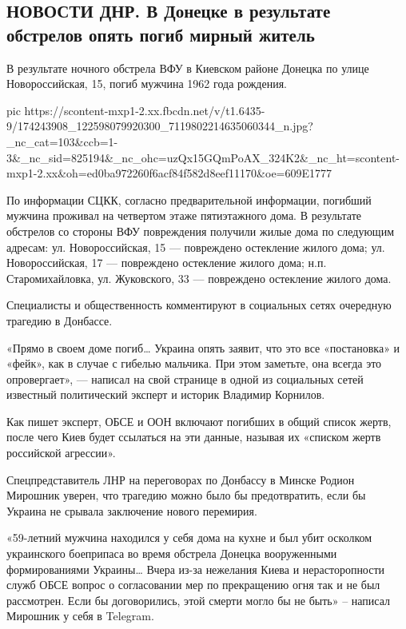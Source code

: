 
 
 
 
 

\subsection{НОВОСТИ ДНР. В Донецке в результате обстрелов опять погиб мирный житель}
\label{sec:15_04_2021.fb.respublikalnr.5.obstrel_doneck}

В результате ночного обстрела ВФУ в Киевском районе Донецка по улице Новороссийская, 15, погиб мужчина 1962 года рождения.

\ifcmt
  pic https://scontent-mxp1-2.xx.fbcdn.net/v/t1.6435-9/174243908_122598079920300_7119802214635060344_n.jpg?_nc_cat=103&ccb=1-3&_nc_sid=825194&_nc_ohc=uzQx15GQmPoAX_324K2&_nc_ht=scontent-mxp1-2.xx&oh=ed0ba972260f6acf84f582d8eef11170&oe=609E1777
\fi

По информации СЦКК, согласно предварительной информации, погибший мужчина
проживал на четвертом этаже пятиэтажного дома. В результате обстрелов со
стороны ВФУ повреждения получили жилые дома по следующим адресам: ул.
Новороссийская, 15 — повреждено остекление жилого дома; ул. Новороссийская, 17
— повреждено остекление жилого дома; н.п. Старомихайловка, ул. Жуковского, 33 —
повреждено остекление жилого дома.

Специалисты и общественность комментируют в социальных сетях очередную трагедию в Донбассе.

«Прямо в своем доме погиб… Украина опять заявит, что это все «постановка» и
«фейк», как в случае с гибелью мальчика. При этом заметьте, она всегда это
опровергает», — написал на свой странице в одной из социальных сетей известный
политический эксперт и историк Владимир Корнилов.

Как пишет эксперт, ОБСЕ и ООН включают погибших в общий список жертв, после
чего Киев будет ссылаться на эти данные, называя их «списком жертв российской
агрессии».

Спецпредставитель ЛНР на переговорах по Донбассу в Минске Родион Мирошник
уверен, что трагедию можно было бы предотвратить, если бы Украина не срывала
заключение нового перемирия.

«59-летний мужчина находился у себя дома на кухне и был убит осколком
украинского боеприпаса во время обстрела Донецка вооруженными формированиями
Украины… Вчера из-за нежелания Киева и нерасторопности служб ОБСЕ вопрос о
согласовании мер по прекращению огня так и не был рассмотрен. Если бы
договорились, этой смерти могло бы не быть» – написал Мирошник у себя в
Telegram.
